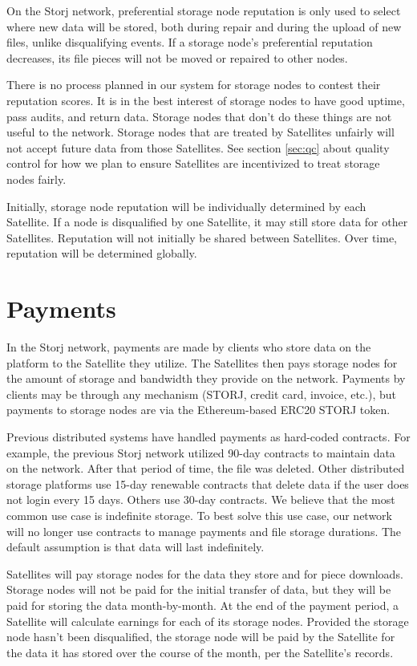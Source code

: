 \documentclass[8pt,fleqn,openany]{book}
\begin{document}
On the Storj network, preferential storage node reputation is only used to
select where new data will be stored, both during repair and during the
upload of new files, unlike disqualifying events.
If a storage node's preferential reputation decreases, its file pieces will not
be moved or repaired to other nodes.

There is no process planned in our system for storage nodes to contest their
reputation scores. It is in the best interest of storage nodes to have good
uptime, pass audits, and return data. Storage nodes that don't do these things
are not useful to the network. Storage nodes that are treated by Satellites
unfairly will not accept future data from those Satellites. See section
\ref{sec:qc} about quality control for how we plan to ensure Satellites are
incentivized to treat storage nodes fairly.

Initially, storage node reputation will be individually determined by each
Satellite. If a node is disqualified by one Satellite, it may still
store data for other Satellites. Reputation will not initially be shared between
Satellites. Over time, reputation will be determined globally.

\section{Payments}\label{sec:concrete-payments}

In the Storj network, payments are made by clients who store data on the
platform to the Satellite they utilize.
The Satellites then pays storage nodes for the amount of storage and bandwidth
they provide on the network.
Payments by clients may be through any mechanism (STORJ, credit card, invoice,
etc.),
but payments to storage nodes are via the Ethereum-based ERC20 \cite{erc20} STORJ
token.

Previous distributed systems have handled payments as hard-coded contracts.
For example, the previous Storj network utilized 90-day contracts to maintain
data on the network. After that period of time, the file was deleted.
Other distributed storage platforms use 15-day renewable contracts that delete
data if the user does not login every 15 days. Others use 30-day contracts.
We believe that the most common use case is indefinite storage. To best solve
this use case, our network will no longer use contracts to manage payments
and file storage durations. The default assumption is that data will last
indefinitely.

Satellites will pay storage nodes for the data they store
and for piece downloads.
Storage nodes will not be paid for the initial transfer of data, but they
will be paid for storing the data month-by-month. At the end of the payment
period, a Satellite will calculate earnings for each of its storage nodes.
Provided the storage node hasn't been disqualified,
the storage node will be paid by the Satellite for the data it has stored
over the course of
the month, per the Satellite's records.
\end{document}
